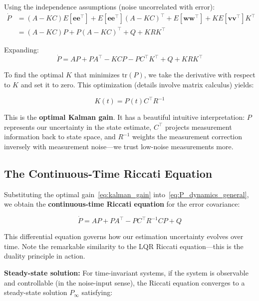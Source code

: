 Using the independence assumptions (noise uncorrelated with error):
\begin{align}
\dot{P} &= (A-KC)E[\mathbf{e}\mathbf{e}^\top] + E[\mathbf{e}\mathbf{e}^\top](A-KC)^\top + E[\mathbf{w}\mathbf{w}^\top] + KE[\mathbf{v}\mathbf{v}^\top]K^\top \\
&= (A-KC)P + P(A-KC)^\top + Q + KRK^\top
\end{align}

Expanding:
\begin{equation}
\dot{P} = AP + PA^\top - KCP - PC^\top K^\top + Q + KRK^\top
\label{eq:P_dynamics_general}
\end{equation}

To find the optimal $K$ that minimizes $\text{tr}(P)$, we take the derivative with respect to $K$ and set it to zero. This optimization (details involve matrix calculus) yields:

\begin{equation}
\boxed{
K(t) = P(t)C^\top R^{-1}
}
\label{eq:kalman_gain}
\end{equation}

This is the \textbf{optimal Kalman gain}. It has a beautiful intuitive interpretation: $P$ represents our uncertainty in the state estimate, $C^\top$ projects measurement information back to state space, and $R^{-1}$ weights the measurement correction inversely with measurement noise---we trust low-noise measurements more.

\subsection{The Continuous-Time Riccati Equation}

Substituting the optimal gain~\eqref{eq:kalman_gain} into~\eqref{eq:P_dynamics_general}, we obtain the \textbf{continuous-time Riccati equation} for the error covariance:

\begin{equation}
\boxed{
\dot{P} = AP + PA^\top - PC^\top R^{-1}CP + Q
}
\label{eq:riccati_continuous}
\end{equation}

This differential equation governs how our estimation uncertainty evolves over time. Note the remarkable similarity to the LQR Riccati equation---this is the duality principle in action.

\textbf{Steady-state solution:} For time-invariant systems, if the system is observable and controllable (in the noise-input sense), the Riccati equation converges to a steady-state solution $P_\infty$ satisfying:


